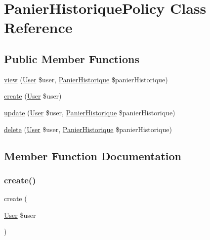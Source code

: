 \hypertarget{class_app_1_1_policies_1_1_panier_historique_policy}{}\section{Panier\+Historique\+Policy Class Reference}
\label{class_app_1_1_policies_1_1_panier_historique_policy}
\subsection*{Public Member Functions}
\begin{DoxyCompactItemize}
\item 
\mbox{\hyperlink{class_app_1_1_policies_1_1_panier_historique_policy_a3cbf58e95fde57630c4e2073c4f1b1c3}{view}} (\mbox{\hyperlink{class_app_1_1_user}{User}} \$user, \mbox{\hyperlink{class_app_1_1_panier_historique}{Panier\+Historique}} \$panier\+Historique)
\item 
\mbox{\hyperlink{class_app_1_1_policies_1_1_panier_historique_policy_a7626db07d2ee9a50d2839c019dbf037d}{create}} (\mbox{\hyperlink{class_app_1_1_user}{User}} \$user)
\item 
\mbox{\hyperlink{class_app_1_1_policies_1_1_panier_historique_policy_a4b8318938bf21ebb4cf99e137a5875a8}{update}} (\mbox{\hyperlink{class_app_1_1_user}{User}} \$user, \mbox{\hyperlink{class_app_1_1_panier_historique}{Panier\+Historique}} \$panier\+Historique)
\item 
\mbox{\hyperlink{class_app_1_1_policies_1_1_panier_historique_policy_ad375a6da42546e40701a1dae47aa04a4}{delete}} (\mbox{\hyperlink{class_app_1_1_user}{User}} \$user, \mbox{\hyperlink{class_app_1_1_panier_historique}{Panier\+Historique}} \$panier\+Historique)
\end{DoxyCompactItemize}


\subsection{Member Function Documentation}
\mbox{\label{class_app_1_1_policies_1_1_panier_historique_policy_a7626db07d2ee9a50d2839c019dbf037d}} 
\subsubsection{\texorpdfstring{create()}{create()}}
{\footnotesize\ttfamily create (\begin{DoxyParamCaption}\item[{\mbox{\hyperlink{class_app_1_1_user}{User}}}]{\$user }\end{DoxyParamCaption})}

